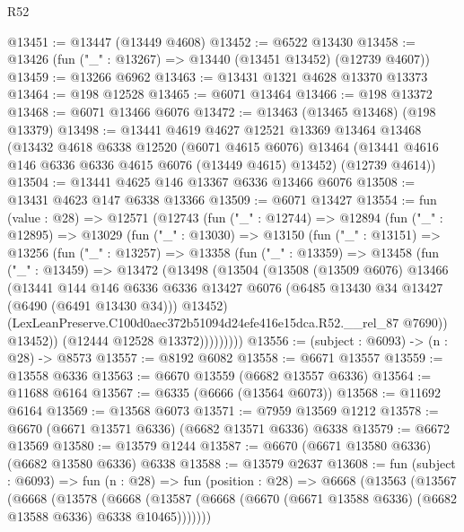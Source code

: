 \begin{lexlean}{R52}
\begin{coremodule}
@13451 := @13447 (@13449 @4608)
@13452 := @6522 @13430
@13458 := @13426 (fun ("_" : @13267) => @13440 (@13451 @13452) (@12739 @4607))
@13459 := @13266 @6962
@13463 := @13431 @1321 @4628 @13370 @13373
@13464 := @198 @12528
@13465 := @6071 @13464
@13466 := @198 @13372
@13468 := @6071 @13466 @6076
@13472 := @13463 (@13465 @13468) (@198 @13379)
@13498 := @13441
    @4619
    @4627
    @12521
    @13369
    @13464
    @13468
    (@13432
      @4618
      @6338
      @12520
      (@6071 @4615 @6076)
      @13464
      (@13441 @4616 @146 @6336 @6336 @4615 @6076 (@13449 @4615) @13452)
      (@12739 @4614))
@13504 := @13441 @4625 @146 @13367 @6336 @13466 @6076
@13508 := @13431 @4623 @147 @6338 @13366
@13509 := @6071 @13427
@13554 := fun (value : @28) =>
  @12571
    (@12743
      (fun ("_" : @12744) =>
      @12894
        (fun ("_" : @12895) =>
        @13029
          (fun ("_" : @13030) =>
          @13150
            (fun ("_" : @13151) =>
            @13256
              (fun ("_" : @13257) =>
              @13358
                (fun ("_" : @13359) =>
                @13458
                  (fun ("_" : @13459) =>
                  @13472
                    (@13498
                      (@13504
                        (@13508
                          (@13509 @6076)
                          @13466
                          (@13441
                            @144
                            @146
                            @6336
                            @6336
                            @13427
                            @6076
                            (@6485 @13430 @34 @13427 (@6490 (@6491 @13430 @34)))
                            @13452)
                          (LexLeanPreserve.C100d0aec372b51094d24efe416e15dca.R52.__rel_87 @7690))
                        @13452))
                    (@12444 @12528 @13372)))))))))
@13556 := (subject : @6093) -> (n : @28) -> @8573
@13557 := @8192 @6082
@13558 := @6671 @13557
@13559 := @13558 @6336
@13563 := @6670 @13559 (@6682 @13557 @6336)
@13564 := @11688 @6164
@13567 := @6335 (@6666 (@13564 @6073))
@13568 := @11692 @6164
@13569 := @13568 @6073
@13571 := @7959 @13569 @1212
@13578 := @6670 (@6671 @13571 @6336) (@6682 @13571 @6336) @6338
@13579 := @6672 @13569
@13580 := @13579 @1244
@13587 := @6670 (@6671 @13580 @6336) (@6682 @13580 @6336) @6338
@13588 := @13579 @2637
@13608 := fun (subject : @6093) =>
  fun (n : @28) =>
  fun (position : @28) =>
  @6668
    (@13563
      (@13567
        (@6668
          (@13578
            (@6668
              (@13587 (@6668 (@6670 (@6671 @13588 @6336) (@6682 @13588 @6336) @6338 @10465)))))))

\end{coremodule}
\end{lexlean}
